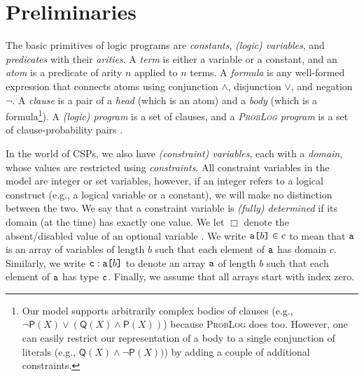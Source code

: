 \section{Preliminaries}

The basic primitives of logic programs are \emph{constants}, \emph{(logic)
  variables}, and \emph{predicates} with their \emph{arities}. A \emph{term} is
either a variable or a constant, and an \emph{atom} is a predicate of arity $n$
applied to $n$ terms. A \emph{formula} is any well-formed expression that
connects atoms using conjunction $\land$, disjunction $\lor$, and negation
$\neg$. A \emph{clause} is a pair of a \emph{head} (which is an atom) and a
\emph{body} (which is a formula\footnote{Our model supports arbitrarily complex
  bodies of clauses (e.g., $\neg\mathsf{P}(X) \lor (\mathsf{Q}(X) \land
  \mathsf{P}(X))$) because \textsc{ProbLog} does too. However, one can easily
  restrict our representation of a body to a single conjunction of literals
  (e.g., $\mathsf{Q}(X) \land \neg\mathsf{P}(X))$) by adding a couple of
  additional constraints.}). A \emph{(logic) program} is a set of clauses, and a
\emph{\textsc{ProbLog} program} is a set of clause-probability pairs
\citep{DBLP:journals/tplp/FierensBRSGTJR15}.

In the world of CSPs, we also have \emph{(constraint) variables}, each with a
\emph{domain}, whose values are restricted using \emph{constraints}. All
constraint variables in the model are integer or set variables, however, if an
integer refers to a logical construct (e.g., a logical variable or a constant),
we will make no distinction between the two. We say that a constraint variable
is \emph{(fully) determined} if its domain (at the time) has exactly one value.
We let $\Box$ denote the absent/disabled value of an optional variable
\citep{DBLP:conf/cpaior/MearsSSTMW14}. We write $\arrayd{a}{b}{c}$ to mean that
$\variable{a}$ is an array of variables of length $b$ such that each element of
$\variable{a}$ has domain $c$. Similarly, we write $\arrayt{a}{b}{c}$ to denote
an array $\variable{a}$ of length $b$ such that each element of $\variable{a}$
has type $\variable{c}$. Finally, we assume that all arrays start with index
zero.

